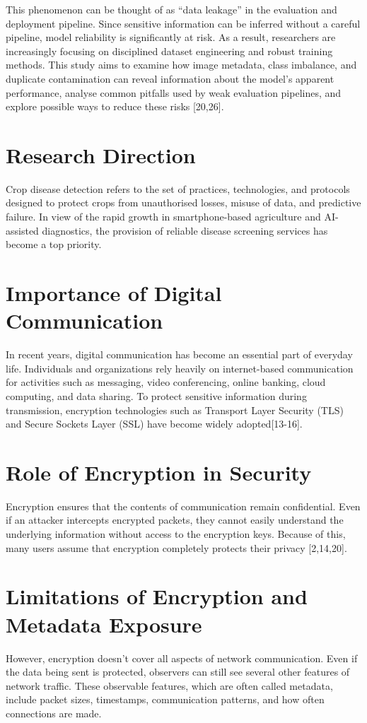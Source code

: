 \documentclass[12pt,a4paper]{report}
\begin{document}
This phenomenon can be thought of as ``data leakage'' in the evaluation and deployment pipeline. Since sensitive information can be inferred without a careful pipeline, model reliability is significantly at risk. As a result, researchers are increasingly focusing on disciplined dataset engineering and robust training methods. This study aims to examine how image metadata, class imbalance, and duplicate contamination can reveal information about the model's apparent performance, analyse common pitfalls used by weak evaluation pipelines, and explore possible ways to reduce these risks [20,26].
 
 \section{Research Direction}
Crop disease detection refers to the set of practices, technologies, and protocols designed to protect crops from unauthorised losses, misuse of data, and predictive failure. In view of the rapid growth in smartphone-based agriculture and AI-assisted diagnostics, the provision of reliable disease screening services has become a top priority.

\section{Importance of Digital Communication}
 In recent years, digital communication has become an essential part of everyday life. Individuals and organizations rely heavily on internet-based communication for activities such as messaging, video conferencing, online banking, cloud computing, and data sharing. To protect sensitive information during transmission, encryption technologies such as Transport Layer Security (TLS) and Secure Sockets Layer (SSL) have become widely adopted[13-16].
 
  \section{Role of Encryption in Security}
 Encryption ensures that the contents of communication remain confidential. Even if an attacker intercepts encrypted packets, they cannot easily understand the underlying information without access to the encryption keys. Because of this, many users assume that encryption completely protects their privacy [2,14,20].
 
  \section{Limitations of Encryption and Metadata Exposure}
However, encryption doesn't cover all aspects of network communication. Even if the data being sent is protected, observers can still see several other features of network traffic. These observable features, which are often called metadata, include packet sizes, timestamps, communication patterns, and how often connections are made.
\end{document}
